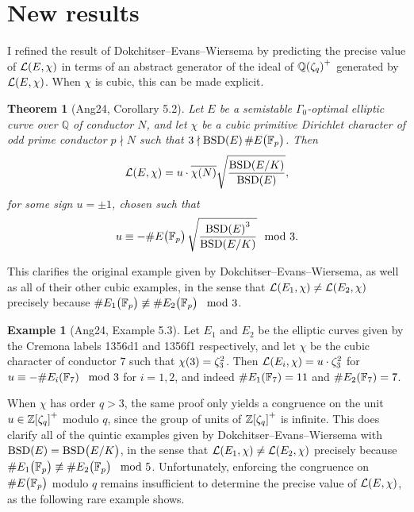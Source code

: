\documentclass{article}
\theoremstyle{plain}
\newtheorem*{theorem}{Theorem}
\theoremstyle{definition}
\newtheorem*{example}{Example}
\newcommand{\BSD}{\mathrm{BSD}}
\newcommand{\FF}{\mathbb{F}}
\newcommand{\LLL}{\mathcal{L}}
\newcommand{\QQ}{\mathbb{Q}}
\newcommand{\ZZ}{\mathbb{Z}}
\newcommand{\br}{\!\del}
\begin{document}
\pagebreak

\section{New results}

I refined the result of Dokchitser--Evans--Wiersema by predicting the precise value of $ \LLL\br{E, \chi} $ in terms of an abstract generator of the ideal of $ \QQ\br[0]{\zeta_q}^+ $ generated by $ \LLL\br{E, \chi} $. When $ \chi $ is cubic, this can be made explicit.

\begin{theorem}[Ang24, Corollary 5.2]
Let $ E $ be a semistable $ \Gamma_0 $-optimal elliptic curve over $ \QQ $ of conductor $ N $, and let $ \chi $ be a cubic primitive Dirichlet character of odd prime conductor $ p \nmid N $ such that $ 3 \nmid \BSD\br{E}\#E\br{\FF_p} $. Then
$$ \LLL\br{E, \chi} = u \cdot \overline{\chi\br{N}}\sqrt{\dfrac{\BSD\br[0]{E / K}}{\BSD\br{E}}}, $$
for some sign $ u = \pm1 $, chosen such that
$$ u \equiv -\#E\br{\FF_p}\sqrt{\dfrac{\BSD\br{E}^3}{\BSD\br[0]{E / K}}} \mod 3. $$
\end{theorem}

This clarifies the original example given by Dokchitser--Evans--Wiersema, as well as all of their other cubic examples, in the sense that $ \LLL\br{E_1, \chi} \ne \LLL\br{E_2, \chi} $ precisely because $ \#E_1\br{\FF_p} \not\equiv \#E_2\br{\FF_p} \mod 3 $.

\begin{example}[Ang24, Example 5.3]
Let $ E_1 $ and $ E_2 $ be the elliptic curves given by the Cremona labels 1356d1 and 1356f1 respectively, and let $ \chi $ be the cubic character of conductor $ 7 $ such that $ \chi\br{3} = \zeta_3^2 $. Then $ \LLL\br{E_i, \chi} = u \cdot \zeta_3^2 $ for $ u \equiv -\#E_i\br{\FF_7} \mod 3 $ for $ i = 1, 2 $, and indeed $ \#E_1\br{\FF_7} = 11 $ and $ \#E_2\br{\FF_7} = 7 $.
\end{example}

When $ \chi $ has order $ q > 3 $, the same proof only yields a congruence on the unit $ u \in \ZZ\sbr[0]{\zeta_q}^+ $ modulo $ q $, since the group of units of $ \ZZ\sbr[0]{\zeta_q}^+ $ is infinite. This does clarify all of the quintic examples given by Dokchitser--Evans--Wiersema with $ \BSD\br{E} = \BSD\br{E / K} $, in the sense that $ \LLL\br{E_1, \chi} \ne \LLL\br{E_2, \chi} $ precisely because $ \#E_1\br{\FF_p} \not\equiv \#E_2\br{\FF_p} \mod 5 $. Unfortunately, enforcing the congruence on $ \#E\br{\FF_p} $ modulo $ q $ remains insufficient to determine the precise value of $ \LLL\br{E, \chi} $, as the following rare example shows.
\end{document}
